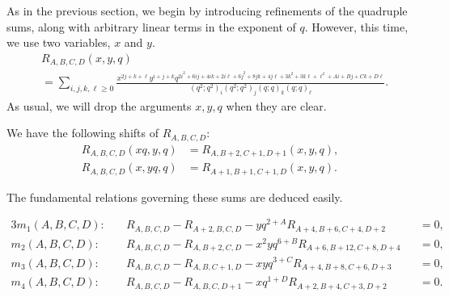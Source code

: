 \documentclass[ALCO,Unicode,published]{cedram}
\begin{document}
As in the previous section, we begin by introducing refinements of the quadruple sums, along with arbitrary linear terms in the exponent of $q$. However, this time, we use two variables, $x$ and $y$.
\begin{align}
\label{eqn:defR}
&R_{A,B,C,D}(x,y,q)\\
&= \sum_{i,j,k,\ell \ge 0}
\frac{x ^{2j + k + \ell } y ^{ i+j+k}q^{2i^2 + 6 ij + 4ik + 2i\ell + 6j^2 + 8 jk + 4 j\ell + 3k^2+3k\ell+\ell^2+Ai+Bj+Ck+D\ell}}
{\left(q^2;q^2\right)_i\left(q^2;q^2\right)_j\left(q;q\right)_k\left(q;q\right)_\ell}. \nonumber
\end{align}
As usual, we will drop the arguments $x,y,q$ when they are clear.

We have the following shifts of $R_{A,B,C,D}$:
\begin{align}
R_{A,B,C,D}(xq,y,q)&=R_{A,B+2,C+1,D+1}(x,y,q) \label{eqn:shiftRx},\\
R_{A,B,C,D}(x,yq,q)&=R_{A+1,B+1,C+1,D}(x,y,q) \label{eqn:shiftRy}.
\end{align}


The fundamental relations governing these sums are deduced easily.
\begin{prop}
\label{prop:mod10rels}
\begin{alignat}{3}
m_1(A,B,C,D):&\quad R_{A,B,C,D}-R_{A+2,B,C,D}-yq^{2+A}R_{A+4,B+6,C+4,D+2}&&=0 \label{eqn:relm1},\\
m_2(A,B,C,D):&\quad R_{A,B,C,D}-R_{A,B+2,C,D}-x^2yq^{6+B}R_{A+6,B+12,C+8,D+4}&&=0 \label{eqn:relm2},\\
m_3(A,B,C,D):&\quad R_{A,B,C,D}-R_{A,B,C+1,D}-xyq^{3+C}R_{A+4,B+8,C+6,D+3}&&=0 \label{eqn:relm3},\\
m_4(A,B,C,D):&\quad R_{A,B,C,D}-R_{A,B,C,D+1}-xq^{1+D}R_{A+2,B+4,C+3,D+2}&&=0 \label{eqn:relm4}.
\end{alignat}
\end{prop}
\end{document}
